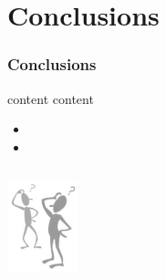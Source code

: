 \documentclass{beamer}
\begin{document}
\section{Conclusions}
\begin{frame}[allowframebreaks] \frametitle{Conclusions}
  content
  \newpage
  content
  \newpage
\end{frame}


\begin{frame}
  
  \begin{itemize}
  \item
  \item 
  \end{itemize}

  
  \begin{columns}
    \column{6cm}
    \begin{block}{}
      \centerline{ 
        \includegraphics[width=0.5\textwidth]{figures/questions.png} 
      }
    \end{block}
  \end{columns}
  
\end{frame}
\end{document}
